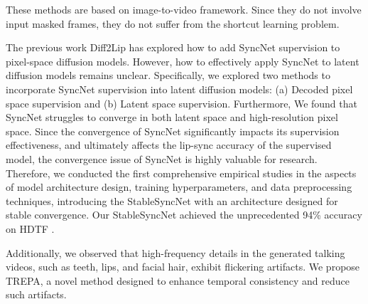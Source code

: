 
These methods \cite{tian2024emo,xu2024hallo,chen2024echomimic,jiang2024loopy} are based on image-to-video framework. Since they do not involve input masked frames, they do not suffer from the shortcut learning problem.

The previous work Diff2Lip \cite{mukhopadhyay2024diff2lip} has explored how to add SyncNet supervision to pixel-space diffusion models. However, how to effectively apply SyncNet to latent diffusion models \cite{rombach2022high} remains unclear. Specifically, we explored two methods to incorporate SyncNet supervision into latent diffusion models: (a) Decoded pixel space supervision and (b) Latent space supervision. Furthermore, We found that SyncNet struggles to converge in both latent space and high-resolution pixel space. Since the convergence of SyncNet significantly impacts its supervision effectiveness, and ultimately affects the lip-sync accuracy of the supervised model, the convergence issue of SyncNet is highly valuable for research. Therefore, we conducted the first  comprehensive empirical studies in the aspects of model architecture design, training hyperparameters, and data preprocessing techniques, introducing the StableSyncNet with an architecture designed for stable convergence. Our StableSyncNet achieved the unprecedented 94\% accuracy on HDTF \cite{zhang2021flow}.

Additionally, we observed that high-frequency details in the generated talking videos, such as teeth, lips, and facial hair, exhibit flickering artifacts. We propose TREPA, a novel method designed to enhance temporal consistency and reduce such artifacts.


